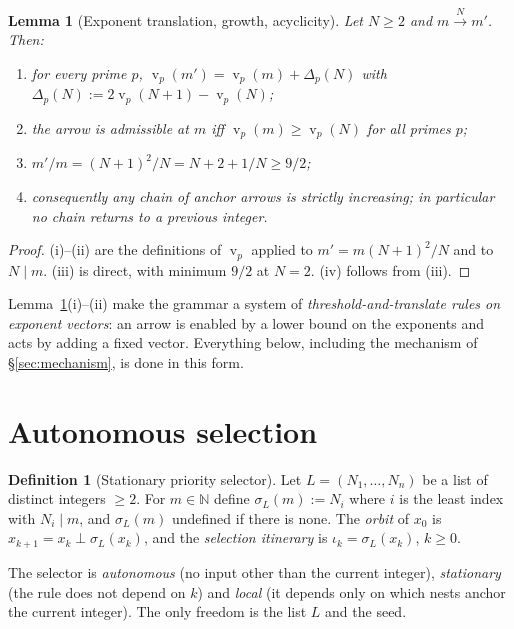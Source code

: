 \documentclass[11pt,a4paper]{article}
\newtheorem{lemma}[theorem]{Lemma}
\theoremstyle{definition}
\newtheorem{definition}[theorem]{Definition}
\newcommand{\N}{\mathbb{N}}
\newcommand{\nest}{\mathbin{\perp}}
\DeclareMathOperator{\vp}{v}
\begin{document}
\begin{lemma}[Exponent translation, growth, acyclicity]\label{lem:exp}
Let $N\ge 2$ and $m\xrightarrow{N}m'$. Then:
\begin{enumerate}[label=(\roman*)]
\item for every prime $p$, $\vp_p(m') = \vp_p(m) + \Delta_p(N)$ with $\Delta_p(N):=2\vp_p(N+1)-\vp_p(N)$;
\item the arrow is admissible at $m$ iff $\vp_p(m)\ge \vp_p(N)$ for all primes $p$;
\item $m'/m = (N+1)^2/N = N+2+1/N\ge 9/2$;
\item consequently any chain of anchor arrows is strictly increasing; in particular no chain returns to a previous integer.
\end{enumerate}
\end{lemma}
\begin{proof}
(i)--(ii) are the definitions of $\vp_p$ applied to $m'=m(N+1)^2/N$ and to $N\mid m$. (iii) is direct, with minimum $9/2$ at $N=2$. (iv) follows from (iii).
\end{proof}

Lemma~\ref{lem:exp}(i)--(ii) make the grammar a system of \emph{threshold-and-translate rules on exponent vectors}: an arrow is enabled by a lower bound on the exponents and acts by adding a fixed vector. Everything below, including the mechanism of \S\ref{sec:mechanism}, is done in this form.

\section{Autonomous selection}\label{sec:selection}

\begin{definition}[Stationary priority selector]\label{def:selector}
Let $L=(N_1,\dots,N_n)$ be a list of distinct integers $\ge2$. For $m\in\N$ define $\sigma_L(m):=N_i$ where $i$ is the least index with $N_i\mid m$, and $\sigma_L(m)$ undefined if there is none. The \emph{orbit} of $x_0$ is $x_{k+1}=x_k\nest\sigma_L(x_k)$, and the \emph{selection itinerary} is $\iota_k=\sigma_L(x_k)$, $k\ge0$.
\end{definition}

The selector is \emph{autonomous} (no input other than the current integer), \emph{stationary} (the rule does not depend on $k$) and \emph{local} (it depends only on which nests anchor the current integer). The only freedom is the list $L$ and the seed.
\end{document}
